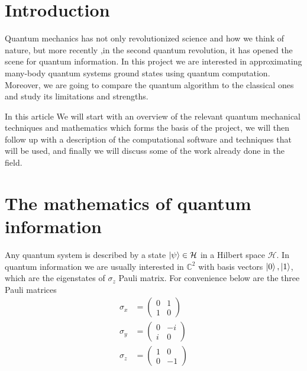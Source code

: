 \documentclass{physics_article}
\date{}
\begin{document}
	\maketitle
	\tableofcontents

	\section{Introduction \label{intro}}
	Quantum mechanics has not only revolutionized science and how we think of nature, but more recently ,in the second quantum revolution, it has opened the scene for quantum information. In this project we are interested in approximating many-body quantum systems ground states using quantum computation. Moreover, we are going to compare the quantum algorithm to the classical ones and study its limitations and strengths. 

	In this article We will start with an overview of the relevant quantum mechanical techniques and mathematics which forms the basis of the project, we will then follow up with a description of the computational software and techniques that will be used, and finally we will discuss some of the work already done in the field.

	\section{The mathematics of quantum information}
	Any quantum system is described by a state $\ket{\psi} \in \mathcal{H}$ in a Hilbert space $\mathcal{H}$. In quantum information we are usually interested in $\mathbb{C}^2$ with basis vectors ${\ket{0},\ket{1}}$, which are the eigenstates of $\sigma_z$ Pauli matrix. For convenience below are the three Pauli matrices
	\begin{align}
		 \sigma_x &= \begin{pmatrix}
		 	0&1\\
		 	1&0
		 \end{pmatrix}\\
		 \sigma_y &= \begin{pmatrix}
		 	0&-i\\
		 	i&0
		 \end{pmatrix}\\
		 \sigma_z &= \begin{pmatrix}
		 	1&0\\
		 	0&-1
		 \end{pmatrix}
	 \end{align}
\end{document}
